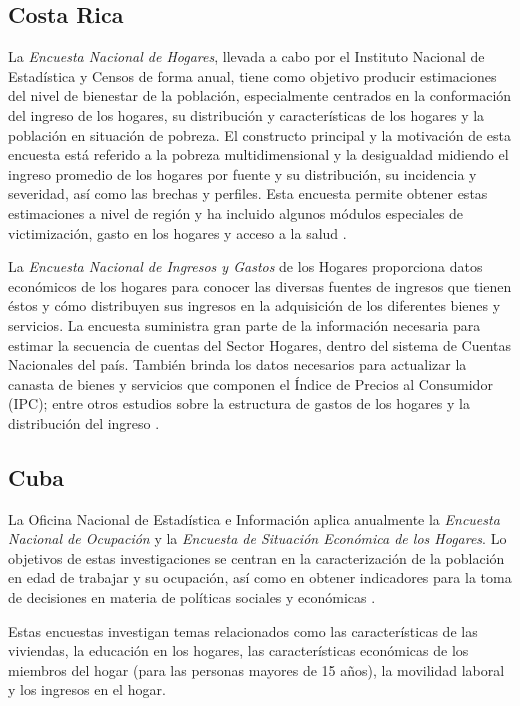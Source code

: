 \documentclass[
  12pt,
]{book}
\begin{document}
\hypertarget{costa-rica}{%
\subsection{Costa Rica}\label{costa-rica}}

La \emph{Encuesta Nacional de Hogares}, llevada a cabo por el Instituto Nacional de Estadística y Censos de forma anual, tiene como objetivo producir estimaciones del nivel de bienestar de la población, especialmente centrados en la conformación del ingreso de los hogares, su distribución y características de los hogares y la población en situación de pobreza. El constructo principal y la motivación de esta encuesta está referido a la pobreza multidimensional y la desigualdad midiendo el ingreso promedio de los hogares por fuente y su distribución, su incidencia y severidad, así como las brechas y perfiles. Esta encuesta permite obtener estas estimaciones a nivel de región y ha incluido algunos módulos especiales de victimización, gasto en los hogares y acceso a la salud \citep{INEC-CR_2017}.

La \emph{Encuesta Nacional de Ingresos y Gastos} de los Hogares proporciona datos económicos de los hogares para conocer las diversas fuentes de ingresos que tienen éstos y cómo distribuyen sus ingresos en la adquisición de los diferentes bienes y servicios. La encuesta suministra gran parte de la información necesaria para estimar la secuencia de cuentas del Sector Hogares, dentro del sistema de Cuentas Nacionales del país. También brinda los datos necesarios para actualizar la canasta de bienes y servicios que componen el Índice de Precios al Consumidor (IPC); entre otros estudios sobre la estructura de gastos de los hogares y la distribución del ingreso \citep{INEC-CR_2018}.

\hypertarget{cuba}{%
\subsection{Cuba}\label{cuba}}

La Oficina Nacional de Estadística e Información aplica anualmente la \emph{Encuesta Nacional de Ocupación} y la \emph{Encuesta de Situación Económica de los Hogares}. Lo objetivos de estas investigaciones se centran en la caracterización de la población en edad de trabajar y su ocupación, así como en obtener indicadores para la toma de decisiones en materia de políticas sociales y económicas \citep{ONE-CU}.

Estas encuestas investigan temas relacionados como las características de las viviendas, la educación en los hogares, las características económicas de los miembros del hogar (para las personas mayores de 15 años), la movilidad laboral y los ingresos en el hogar.
\end{document}
